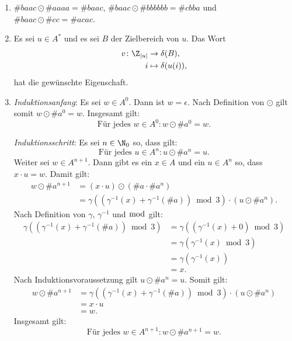 \documentclass[12pt]{article}
\begin{document}
\begin{loesung}
  \begin{enumerate}
    \item $\#{baac} \odot \#{aaaa} = \#{baac}$,
          $\#{baac} \odot \#{bbbbbb} = \#{cbba}$ und
          $\#{baac} \odot \#{cc} = \#{acac}$.
    \item Es sei $u \in A^*$ und es sei $B$ der Zielbereich von $u$. Das Wort
          \begin{align*}
            v \colon \Z_{|u|} &\to     \delta(B),\\
                            i &\mapsto \delta(u(i)),
          \end{align*}
          hat die gewünschte Eigenschaft.
    \item \emph{Induktionsanfang}: Es sei $w \in A^0$. Dann ist $w = \epsilon$.
          Nach Definition von $\odot$ gilt somit $w \odot \#a^0 = w$. Insgesamt
          gilt:
          \begin{equation*}
            \text{Für jedes } w \in A^0 \colon w \odot \#a^0 = w.
          \end{equation*}

          \emph{Induktionsschritt}: Es sei $n \in \N_0$ so, dass gilt:
          \begin{equation}\tag{Induktionsvoraussetzung}
            \text{Für jedes } u \in A^n \colon u \odot \#a^n = u.
          \end{equation}
          Weiter sei $w \in A^{n + 1}$. Dann gibt es ein $x \in A$ und ein
          $u \in A^n$ so, dass $x \cdot u = w$. Damit gilt:
          \begin{align*}
            w \odot \#a^{n + 1} &= (x \cdot u) \odot (\#a \cdot \#a^n)\\
                                &= \gamma((\gamma^{-1}(x) + \gamma^{-1}(\#a)) \bmod 3) \cdot (u \odot \#a^n).
          \end{align*}
          Nach Definition von $\gamma$, $\gamma^{-1}$ und $\bmod$ gilt:
          \begin{align*}
            \gamma((\gamma^{-1}(x) + \gamma^{-1}(\#a)) \bmod 3)
            &= \gamma((\gamma^{-1}(x) + 0) \bmod 3)\\
            &= \gamma(\gamma^{-1}(x) \bmod 3)\\
            &= \gamma(\gamma^{-1}(x))\\
            &= x.
          \end{align*}
          Nach Induktionsvoraussetzung gilt $u \odot \#a^n = u$. Somit gilt:
          \begin{align*}
            w \odot \#a^{n + 1} &= \gamma((\gamma^{-1}(x) + \gamma^{-1}(\#a)) \bmod 3) \cdot (u \odot \#a^n)\\
                                &= x \cdot u\\
                                &= w.
          \end{align*}
          Insgesamt gilt:
          \begin{equation*}
            \text{Für jedes } w \in A^{n + 1} \colon w \odot \#a^{n + 1} = w.
          \end{equation*}


\end{enumerate}
\end{loesung}
\end{document}
